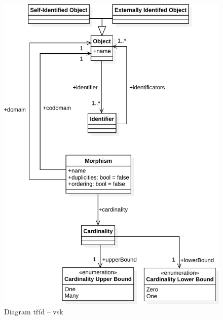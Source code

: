 \begin{figure}[!htb]
  \centering
  \includegraphics[width=\maxwidth{\textwidth}]{../img/diagrams/scv-model.pdf}
  \caption{Diagram tříd -- \acrlong{vsk}}
  \label{fig:class-diagram:scv}
\end{figure}

